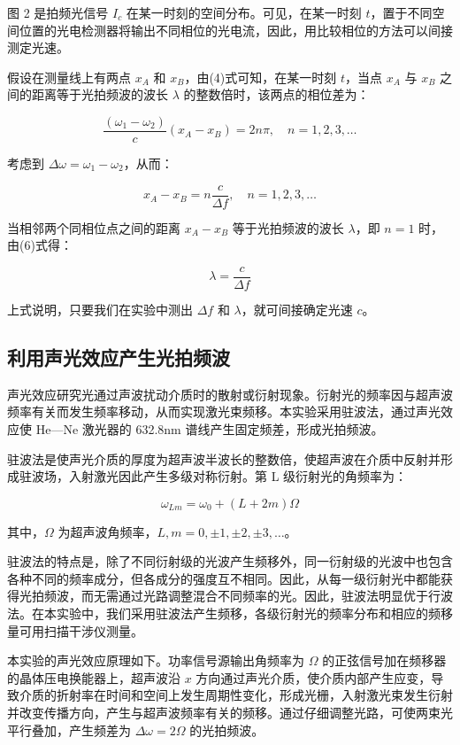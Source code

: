\documentclass[12pt,a4paper]{article}
\newcommand{\be}[1]{
    \begin{equation}
        #1
    \end{equation}
}
\begin{document}
图 2 是拍频光信号 $I_c$ 在某一时刻的空间分布。可见，在某一时刻 $t$，置于不同空间位置的光电检测器将输出不同相位的光电流，因此，用比较相位的方法可以间接测定光速。

假设在测量线上有两点 $x_A$ 和 $x_B$，由(4)式可知，在某一时刻 $t$，当点 $x_A$ 与 $x_B$ 之间的距离等于光拍频波的波长 $\lambda$ 的整数倍时，该两点的相位差为：


\be{\frac{(\omega_1 - \omega_2)}{c} (x_A - x_B) = 2n\pi, \quad n = 1,2,3, \ldots }

考虑到 $\Delta \omega = \omega_1 - \omega_2$，从而：


\be{x_A - x_B = n \frac{c}{\Delta f}, \quad n = 1,2,3, \ldots }

当相邻两个同相位点之间的距离 $x_A - x_B$ 等于光拍频波的波长 $\lambda$，即 $n=1$ 时，由(6)式得：

\be{\lambda = \frac{c}{\Delta f} }

上式说明，只要我们在实验中测出 $\Delta f$ 和 $\lambda$，就可间接确定光速 $c$。

\subsection{利用声光效应产生光拍频波}

声光效应研究光通过声波扰动介质时的散射或衍射现象。衍射光的频率因与超声波频率有关而发生频率移动，从而实现激光束频移。本实验采用驻波法，通过声光效应使 He—Ne 激光器的 632.8nm 谱线产生固定频差，形成光拍频波。

驻波法是使声光介质的厚度为超声波半波长的整数倍，使超声波在介质中反射并形成驻波场，入射激光因此产生多级对称衍射。第 L 级衍射光的角频率为：


\be{\omega_{Lm} = \omega_0 + (L + 2m)\Omega }

其中，$\Omega$ 为超声波角频率，$L, m = 0, \pm1, \pm2, \pm3, \ldots$。

驻波法的特点是，除了不同衍射级的光波产生频移外，同一衍射级的光波中也包含各种不同的频率成分，但各成分的强度互不相同。因此，从每一级衍射光中都能获得光拍频波，而无需通过光路调整混合不同频率的光。因此，驻波法明显优于行波法。在本实验中，我们采用驻波法产生频移，各级衍射光的频率分布和相应的频移量可用扫描干涉仪测量。

本实验的声光效应原理如下。功率信号源输出角频率为 $\Omega$ 的正弦信号加在频移器的晶体压电换能器上，超声波沿 $x$ 方向通过声光介质，使介质内部产生应变，导致介质的折射率在时间和空间上发生周期性变化，形成光栅，入射激光束发生衍射并改变传播方向，产生与超声波频率有关的频移。通过仔细调整光路，可使两束光平行叠加，产生频差为 $\Delta \omega =2 \Omega$ 的光拍频波。
\end{document}
